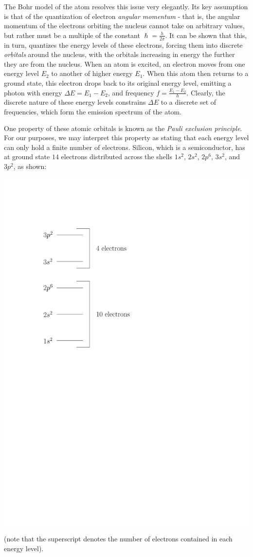 \documentclass[letterpaper]{article}
\theoremstyle{remark}
\begin{document}
The Bohr model of the atom resolves this issue very elegantly. Its key assumption is that of the quantization of electron \emph{angular momentum} - that is, the angular momentum of the electrons orbiting the nucleus cannot take on arbitrary values, but rather must be a multiple of the constant $\hslash = \frac{h}{2\pi}$. It can be shown that this, in turn, quantizes the energy levels of these electrons, forcing them into discrete \emph{orbitals} around the nucleus, with the orbitals increasing in energy the further they are from the nucleus. When an atom is excited, an electron moves from one energy level $E_2$ to another of higher energy $E_1$. When this atom then returns to a ground state, this electron drops back to its original energy level, emitting a photon with energy $\Delta E = E_1 - E_2$, and frequency $f = \frac{E_1 - E_2}{h}$. Clearly, the discrete nature of these energy levels constrains $\Delta E$ to a discrete set of frequencies, which form the emission spectrum of the atom.

One property of these atomic orbitals is known as the \emph{Pauli exclusion principle}. For our purposes, we may interpret this property as stating that each energy level can only hold a finite number of electrons. Silicon, which is a semiconductor, has at ground state $14$ electrons distributed across the shells $1s^2$, $2s^2$, $2p^6$, $3s^2$, and $3p^2$, as shown:
\begin{center}
    \includegraphics[scale=0.7]{si_shells.pdf}
\end{center}
(note that the superscript denotes the number of electrons contained in each energy level).
\end{document}
